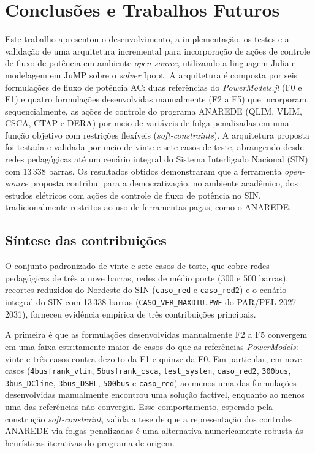 \chapter{Conclusões e Trabalhos Futuros}
\label{chap:conclusoes-e-trabalhos-futuros}

Este trabalho apresentou o desenvolvimento, a implementação, os testes e a validação de uma arquitetura incremental para incorporação de ações de controle de fluxo de potência em ambiente \textit{open-source}, utilizando a linguagem Julia e modelagem em JuMP sobre o \textit{solver} Ipopt. A arquitetura é composta por seis formulações de fluxo de potência AC: duas referências do \textit{PowerModels.jl} (F0 e F1) e quatro formulações desenvolvidas manualmente (F2 a F5) que incorporam, sequencialmente, as ações de controle do programa ANAREDE (QLIM, VLIM, CSCA, CTAP e DERA) por meio de variáveis de folga penalizadas em uma função objetivo com restrições flexíveis (\textit{soft-constraints}). A arquitetura proposta foi testada e validada por meio de vinte e sete casos de teste, abrangendo desde redes pedagógicas até um cenário integral do Sistema Interligado Nacional (SIN) com 13\,338 barras. Os resultados obtidos demonstraram que a ferramenta \textit{open-source} proposta contribui para a democratização, no ambiente acadêmico, dos estudos elétricos com ações de controle de fluxo de potência no SIN, tradicionalmente restritos ao uso de ferramentas pagas, como o ANAREDE.

\section{Síntese das contribuições}
\label{sec:contribuicoes-do-trabalho}

O conjunto padronizado de vinte e sete casos de teste, que cobre redes pedagógicas de três a nove barras, redes de médio porte (300 e 500 barras), recortes reduzidos do Nordeste do SIN (\texttt{caso\_red} e \texttt{caso\_red2}) e o cenário integral do SIN com 13\,338 barras (\texttt{CASO\_VER\_MAXDIU.PWF} do PAR/PEL 2027-2031), forneceu evidência empírica de três contribuições principais.

A primeira é que as formulações desenvolvidas manualmente F2 a F5 convergem em uma faixa estritamente maior de casos do que as referências \textit{PowerModels}: vinte e três casos contra dezoito da F1 e quinze da F0. Em particular, em nove casos (\texttt{4busfrank\_vlim}, \texttt{5busfrank\_csca}, \texttt{test\_system}, \texttt{caso\_red2}, \texttt{300bus}, \texttt{3bus\_DCline}, \texttt{3bus\_DSHL}, \texttt{500bus} e \texttt{caso\_red}) ao menos uma das formulações desenvolvidas manualmente encontrou uma solução factível, enquanto ao menos uma das referências não convergiu. Esse comportamento, esperado pela construção \textit{soft-constraint}, valida a tese de que a representação dos controles ANAREDE via folgas penalizadas é uma alternativa numericamente robusta às heurísticas iterativas do programa de origem.

